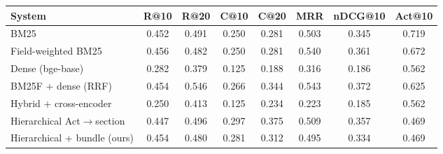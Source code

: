 \begin{tabular}{lccccccc}
\toprule
System & R@10 & R@20 & C@10 & C@20 & MRR & nDCG@10 & Act@10 \\
\midrule
BM25 & 0.452 & 0.491 & 0.250 & 0.281 & 0.503 & 0.345 & 0.719 \\
Field-weighted BM25 & 0.456 & 0.482 & 0.250 & 0.281 & 0.540 & 0.361 & 0.672 \\
Dense (bge-base) & 0.282 & 0.379 & 0.125 & 0.188 & 0.316 & 0.186 & 0.562 \\
BM25F + dense (RRF) & 0.454 & 0.546 & 0.266 & 0.344 & 0.543 & 0.372 & 0.625 \\
Hybrid + cross-encoder & 0.250 & 0.413 & 0.125 & 0.234 & 0.223 & 0.185 & 0.562 \\
Hierarchical Act$\rightarrow$section & 0.447 & 0.496 & 0.297 & 0.375 & 0.509 & 0.357 & 0.469 \\
Hierarchical + bundle (ours) & 0.454 & 0.480 & 0.281 & 0.312 & 0.495 & 0.334 & 0.469 \\
\bottomrule
\end{tabular}
